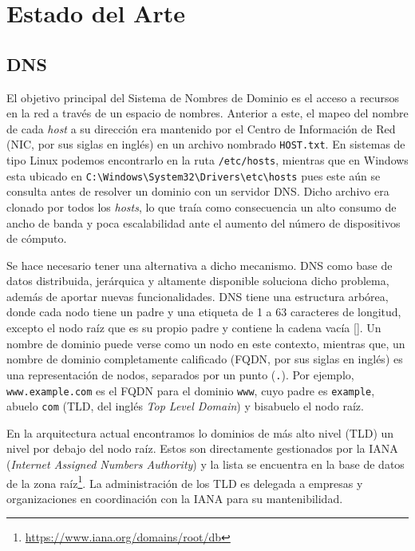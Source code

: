 \chapter{Estado del Arte}\label{chapter:state-of-the-art}

\section{DNS}

El objetivo principal del Sistema de Nombres de Dominio es el acceso a recursos en la red a través de un espacio de nombres. Anterior a este, el mapeo del nombre de cada \textit{host} a su dirección era mantenido por el Centro de Información de Red (NIC, por sus siglas en inglés) en un archivo nombrado \verb+HOST.txt+. En sistemas de tipo Linux podemos encontrarlo en la ruta \verb+/etc/hosts+, mientras que en Windows esta ubicado en \verb+C:\Windows\System32\Drivers\etc\hosts+ pues este aún se consulta antes de resolver un dominio con un servidor DNS. Dicho archivo era clonado por todos los \textit{hosts}, lo que traía como consecuencia un alto consumo de ancho de banda y poca escalabilidad ante el aumento del número de dispositivos de cómputo.

Se hace necesario tener una alternativa a dicho mecanismo. DNS como base de datos distribuida, jerárquica y altamente disponible soluciona dicho problema, además de aportar nuevas funcionalidades. DNS tiene una estructura arbórea, donde cada nodo tiene un padre y una etiqueta de 1 a 63 caracteres de longitud, excepto el nodo raíz que es su propio padre y contiene la cadena vacía [\cite{Vixie_2007}]. Un nombre de dominio puede verse como un nodo en este contexto, mientras que, un nombre de dominio completamente calificado (FQDN, por sus siglas en inglés) es una representación de nodos, separados por un punto (\verb+.+). Por ejemplo, \verb+www.example.com+ es el FQDN para el dominio \verb+www+, cuyo padre es \verb+example+, abuelo \verb+com+ (TLD, del inglés \textit{Top Level Domain}) y bisabuelo el nodo raíz.

En la arquitectura actual encontramos lo dominios de más alto nivel (TLD) un nivel por debajo del nodo raíz. Estos son directamente gestionados por la IANA (\textit{Internet Assigned Numbers Authority}) y la lista se encuentra en la base de datos de la zona raíz\footnote{\url{https://www.iana.org/domains/root/db}}. La administración de los TLD es delegada a empresas y organizaciones en coordinación con la IANA para su mantenibilidad.

